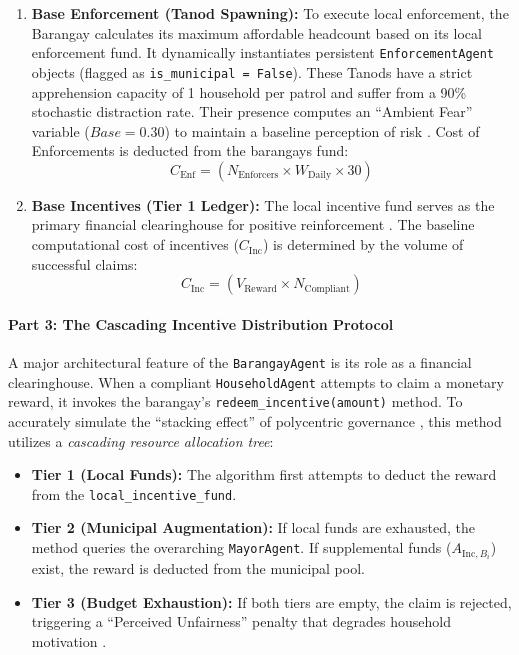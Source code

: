 \begin{enumerate}
    \item \textbf{Base Enforcement (Tanod Spawning):} To execute local enforcement, the Barangay calculates its maximum affordable headcount based on its local enforcement fund. It dynamically instantiates persistent \texttt{EnforcementAgent} objects (flagged as \texttt{is\_municipal = False}). These Tanods have a strict apprehension capacity of 1 household per patrol and suffer from a 90\% stochastic distraction rate. Their presence computes an ``Ambient Fear'' variable ($Base = 0.30$) to maintain a baseline perception of risk \citep{Zhao2022}. Cost of Enforcements is deducted from the barangays fund:
    \begin{equation}
        C_{\mathrm{Enf}} = (N_{\mathrm{Enforcers}} \times W_{\mathrm{Daily}} \times 30)
        \label{eq:cost_of_enforcement}
    \end{equation}

    \item \textbf{Base Incentives (Tier 1 Ledger):} The local incentive fund serves as the primary financial clearinghouse for positive reinforcement \citep{Chen2023}. The baseline computational cost of incentives ($C_{\mathrm{Inc}}$) is determined by the volume of successful claims:
    \begin{equation}
        C_{\mathrm{Inc}} = (V_{\mathrm{Reward}} \times N_{\mathrm{Compliant}})
        \label{eq:total_incentive_cost}
    \end{equation}
\end{enumerate}

\paragraph{Part 3: The Cascading Incentive Distribution Protocol}

A major architectural feature of the \texttt{BarangayAgent} is its role as a financial clearinghouse. When a compliant \texttt{HouseholdAgent} attempts to claim a monetary reward, it invokes the barangay's \texttt{redeem\_incentive(amount)} method. To accurately simulate the ``stacking effect'' of polycentric governance \citep{Ostrom2010}, this method utilizes a \textit{cascading resource allocation tree}:

\begin{itemize}
    \item \textbf{Tier 1 (Local Funds):} The algorithm first attempts to deduct the  reward from the \texttt{local\_incentive\_fund}. 
    \item \textbf{Tier 2 (Municipal Augmentation):} If local funds are exhausted, the method queries the overarching \texttt{MayorAgent}. If supplemental funds ($A_{\mathrm{Inc}, B_i}$) exist, the reward is deducted from the municipal pool.
    \item \textbf{Tier 3 (Budget Exhaustion):} If both tiers are empty, the claim is rejected, triggering a ``Perceived Unfairness'' penalty that degrades household motivation \citep{Chen2023}.
\end{itemize}

